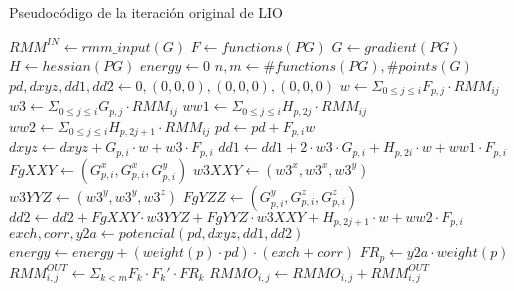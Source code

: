 \begin{algorithm}[H]
        \caption{Pseudoc\'odigo de la iteraci\'on original de LIO}
        \label{algo:lio-iteration}
        \begin{algorithmic}
              \State $RMM^{IN} \gets rmm\_input(G)$
              \State $F \gets functions(PG)$
              \State $G \gets gradient(PG)$
              \State $H \gets hessian(PG)$
              \State $energy \gets 0$
              \State $n,m \gets \# functions(PG), \# points(G)$
              \ForAll{$p \in [0..m)$}
                  \State $pd, dxyz,dd1,dd2 \gets 0, (0,0,0), (0,0,0), (0,0,0)$
                  \ForAll{$i \in [0..n)$}
                      \State $w \gets \Sigma_{0 \leq j \leq i} F_{p,j} \cdot RMM_{ij}$
                      \State $w3 \gets \Sigma_{0 \leq j \leq i} G_{p,j} \cdot RMM_{ij}$
                      \State $ww1 \gets \Sigma_{0 \leq j \leq i} H_{p,2j} \cdot RMM_{ij}$
                      \State $ww2 \gets \Sigma_{0 \leq j \leq i} H_{p,2j+1} \cdot RMM_{ij}$
                      \State $pd \gets pd + F_{p,i} w$
                      \State $dxyz \gets dxyz + G_{p,i} \cdot w + w3 \cdot F_{p,i}$
                      \State $dd1 \gets dd1 + 2 \cdot w3 \cdot G_{p,i} + H_{p,2i} \cdot w + ww1 \cdot F_{p,i}$
                      \State $FgXXY \gets (G_{p,i}^x, G_{p,i}^x, G_{p,i}^y)$
                      \State $w3XXY \gets (w3^x, w3^x, w3^y)$
                      \State $w3YYZ \gets (w3^y, w3^y, w3^z)$
                      \State $FgYZZ \gets (G_{p,i}^y, G_{p,i}^z, G_{p,i}^z)$
                      \State $dd2 \gets dd2 + FgXXY \cdot w3YYZ + FgYYZ \cdot w3XXY + H_{p,2j+1} \cdot w + ww2 \cdot F_{p,i}$
                  \EndFor 
                  \State $exch, corr, y2a \gets potencial(pd, dxyz, dd1, dd2)$
                  \State $energy \gets energy + (weight(p) \cdot pd) \cdot (exch + corr)$
                  \State $FR_p \gets y2a \cdot weight(p)$
              \EndFor
              \State $RMM^{OUT}_{i,j} \gets \Sigma_{k < m} F_k \cdot F_k' \cdot FR_k$
                  \State $RMMO_{i,j} \gets RMMO_{i,j} + RMM^{OUT}_{i,j}$
              \EndFor
            \EndFunction
        \end{algorithmic}
\end{algorithm}



